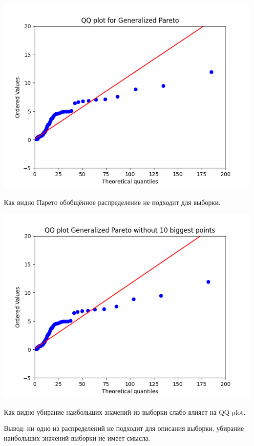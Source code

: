 \documentclass[reprint, amsmath, amssymb, aps,]{revtex4-2}
\begin{document}
\begin{center}
\centering 
\includegraphics[scale=0.6]{Exercise34.png}
\end{center}

Как видно Парето обобщённое распределение не подходит для выборки.

\begin{center}
\centering 
\includegraphics[scale=0.6]{Exercise35.png}
\end{center}
Как видно убирание наибольших значений из выборки слабо влияет на QQ-plot.

Вывод: ни одно из распределений не подходит для описания выборки, убирание наибольших значений выборки не имеет смысла.
\end{document}
